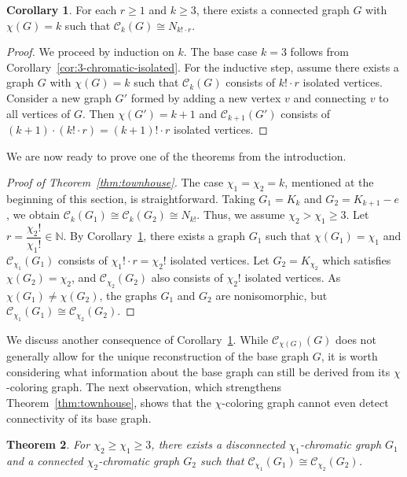 \documentclass{amsart}
\theoremstyle{hypothesisstyle}
\newtheorem{theorem}{Theorem}[section]
\theoremstyle{definition}
\newtheorem{corollary}[theorem]{Corollary}
\theoremstyle{remark}
\numberwithin{equation}{section}
\begin{document}
\begin{corollary}\label{cor:k-chromatic-isolated} For each $r\geq 1$ and $k\geq 3$, there exists a connected graph $G$ with $\chi(G)=k$ such that $\mathcal{C}_k(G)\cong N_{k!\cdot r}$.
\end{corollary}

\begin{proof} We proceed by induction on $k$. The base case $k=3$ follows from Corollary~\ref{cor:3-chromatic-isolated}. For the inductive step, assume there exists a graph $G$ with $\chi(G) = k$ such that $\mathcal{C}_k(G)$ consists of $k! \cdot r$ isolated vertices. Consider a new graph $G'$ formed by adding a new vertex $v$ and connecting $v$ to all vertices of $G$. Then $\chi(G')=k+1$ and $\mathcal{C}_{k+1}(G')$ consists of $(k+1)\cdot (k!\cdot r)=(k+1)!\cdot r$ isolated vertices.
\end{proof}

We are now ready to prove one of the theorems from the introduction.

\begin{proof}[Proof of Theorem~\ref{thm:townhouse}] The case $\chi_1=\chi_2=k$, mentioned at the beginning of this section, is straightforward. Taking $G_1=K_k$ and $G_{2}=K_{k+1}-e$, we obtain $\mathcal{C}_{k}(G_1)\cong \mathcal{C}_{k}(G_2)\cong N_{k!}$. Thus, we assume $\chi_2>\chi_1\geq 3$. Let $r=\dfrac{\chi_2!}{\chi_1!}\in\mathbb{N}$. By Corollary~\ref{cor:k-chromatic-isolated}, there exists a graph $G_1$ such that $\chi(G_1)=\chi_1$ and $\mathcal{C}_{\chi_1}(G_1)$ consists of $\chi_1!\cdot r = \chi_2!$ isolated vertices. Let $G_2=K_{\chi_2}$ which satisfies $\chi(G_2)=\chi_2$, and $\mathcal{C}_{\chi_2}(G_2)$ also consists of $\chi_2!$ isolated vertices. As $\chi(G_1)\neq \chi(G_2)$, the graphs $G_1$ and $G_2$ are nonisomorphic, but $\mathcal{C}_{\chi_1}(G_1)\cong \mathcal{C}_{\chi_2}(G_2)$. \end{proof}

We discuss another consequence of Corollary~\ref{cor:k-chromatic-isolated}. While $\mathcal{C}_{\chi(G)}(G)$ does not generally allow for the unique reconstruction of the base graph $G$, it is worth considering what information about the base graph can still be derived from its $\chi$-coloring graph. The next observation, which strengthens Theorem~\ref{thm:townhouse}, shows that the $\chi$-coloring graph cannot even detect connectivity of its base graph. 

\begin{theorem}
For $\chi_2\geq \chi_1\geq 3$, there exists a disconnected $\chi_1$-chromatic graph $G_1$ and a connected $\chi_2$-chromatic graph $G_2$ such that $\mathcal{C}_{\chi_1}(G_1)\cong \mathcal{C}_{\chi_2}(G_2)$. 
\end{theorem} 
\end{document}
